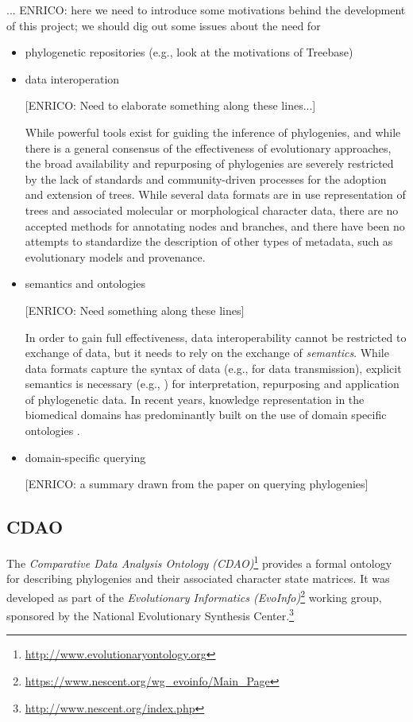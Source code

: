 \documentclass[10pt]{bmc_article}
\newenvironment{bmcformat}{\begin{raggedright}\baselineskip20pt\sloppy\setboolean{publ}{false}}{\end{raggedright}\baselineskip20pt\sloppy}
\begin{document}
\begin{bmcformat}
... ENRICO: here we need to introduce some motivations behind the development of this project; we
should dig out some issues about the need for 
\begin{itemize}
\item phylogenetic repositories (e.g., look at the motivations of Treebase)

\item data interoperation

[ENRICO: Need to elaborate something along these lines...]

While powerful tools exist for guiding the inference of 
phylogenies, and while there is a general consensus of the effectiveness of evolutionary
approaches, the broad availability and repurposing of phylogenies are severely restricted
by the lack of
standards and  community-driven processes for the adoption and extension of trees.
While several data formats are in use representation of trees and associated molecular
or morphological character data, there are no accepted methods for annotating
nodes and branches, and there have been no attempts to standardize the description
of other types of metadata, such as evolutionary models and provenance.

\item semantics and ontologies

[ENRICO: Need something along these lines]

In order to gain full effectiveness, data interoperability cannot be restricted to 
exchange of data, but it needs to rely on the exchange of \emph{semantics}. While
data formats capture the syntax of data (e.g., for data transmission), explicit 
semantics is necessary (e.g., \cite{cdao-evol}) for interpretation, repurposing and 
application of phylogenetic data. In recent years, knowledge representation in 
the biomedical domains has predominantly built on the use of domain
specific ontologies \cite{SK02,Skl01}.

\item domain-specific querying

[ENRICO: a summary drawn from the paper on querying phylogenies]


\end{itemize}



\subsection*{CDAO}

  The \emph{Comparative Data Analysis Ontology (CDAO)}\footnote{\url{http://www.evolutionaryontology.org}} \cite{cdao-evol} provides a formal ontology
  for describing phylogenies and their associated
  character state matrices. It was developed as part of the 
  \emph{Evolutionary Informatics (EvoInfo)}\footnote{\url{https://www.nescent.org/wg_evoinfo/Main_Page}} working group, sponsored by 
  the National Evolutionary Synthesis Center.\footnote{\url{http://www.nescent.org/index.php}}
  

\end{bmcformat}
\end{document}
